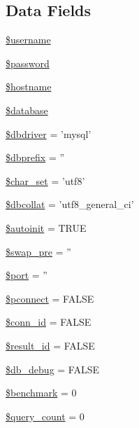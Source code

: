 \subsection*{Data Fields}
\begin{DoxyCompactItemize}
\item 
\hyperlink{class_c_i___d_b__driver_a0eb82aa5f81cf845de4b36cd653c42cf}{\$username}
\item 
\hyperlink{class_c_i___d_b__driver_a607686ef9f99ea7c42f4f3dd3dbb2b0d}{\$password}
\item 
\hyperlink{class_c_i___d_b__driver_a8bf9ffb42ed554b203b55377d1fc9aa4}{\$hostname}
\item 
\hyperlink{class_c_i___d_b__driver_a7691c0162d89de0b6ba47edcd8ba8878}{\$database}
\item 
\hyperlink{class_c_i___d_b__driver_a0cde2a16322a023d040aa7f725877597}{\$dbdriver} = 'mysql'
\item 
\hyperlink{class_c_i___d_b__driver_a81398da65aef92236c2bc2e0307f1fa4}{\$dbprefix} = ''
\item 
\hyperlink{class_c_i___d_b__driver_a0ea660eb249174aefdc2c35238fb1dc8}{\$char\-\_\-set} = 'utf8'
\item 
\hyperlink{class_c_i___d_b__driver_a303eb205131e0266c2a57bcc6a34e80a}{\$dbcollat} = 'utf8\-\_\-general\-\_\-ci'
\item 
\hyperlink{class_c_i___d_b__driver_a97d3ccf64e5b873ebca99d17a2c204d3}{\$autoinit} = T\-R\-U\-E
\item 
\hyperlink{class_c_i___d_b__driver_a913c5a5af0c805fe64f884af6028fb73}{\$swap\-\_\-pre} = ''
\item 
\hyperlink{class_c_i___d_b__driver_aa0787efab4b22e8a212882f3409d4c77}{\$port} = ''
\item 
\hyperlink{class_c_i___d_b__driver_a5b7c010f6dfe8dfd41ce86fdaed67ebf}{\$pconnect} = F\-A\-L\-S\-E
\item 
\hyperlink{class_c_i___d_b__driver_a16c23f1dcbfed2f2759f5e54f604106d}{\$conn\-\_\-id} = F\-A\-L\-S\-E
\item 
\hyperlink{class_c_i___d_b__driver_a0ebacb40e3b6f8bf33d3de0f2cc71474}{\$result\-\_\-id} = F\-A\-L\-S\-E
\item 
\hyperlink{class_c_i___d_b__driver_a2c1bc80cc98589e419a6c535e53735de}{\$db\-\_\-debug} = F\-A\-L\-S\-E
\item 
\hyperlink{class_c_i___d_b__driver_ac75dbf878e2ceec25d2abe6730855f6b}{\$benchmark} = 0
\item 
\hyperlink{class_c_i___d_b__driver_aa7f7fc5b08bc2c3626ea7065d50c8847}{\$query\-\_\-count} = 0

\end{DoxyCompactItemize}
